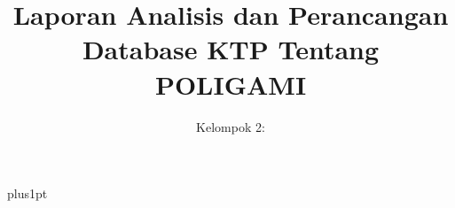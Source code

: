 \documentclass[12pt]{ociamthesis}
\title{Laporan Analisis dan Perancangan Database KTP Tentang POLIGAMI\\[1ex]  }
\author{ Kelompok 2:\\[2ex] }
\begin{document}
\baselineskip=18pt plus1pt

\setcounter{secnumdepth}{3}
\setcounter{tocdepth}{3}
\maketitle

\begin{romanpages}
\tableofcontents
\listoffigures
\end{romanpages}




\end{document}
